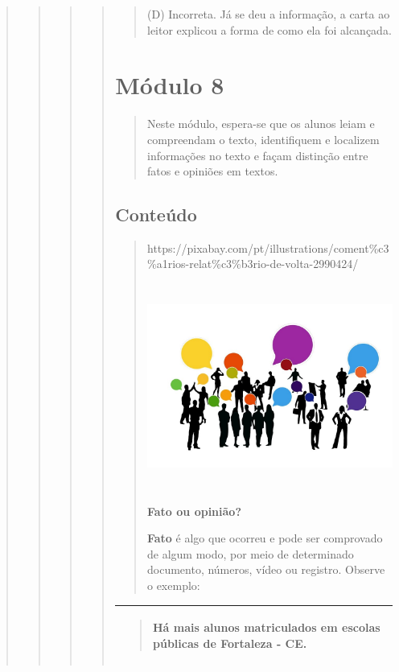\begin{quote}
\begin{quote}
\begin{quote}
\begin{quote}
\begin{quote}
(D) Incorreta. Já se deu a informação, a carta ao leitor explicou a
forma de como ela foi alcançada.
\end{quote}

\section{Módulo 8}\label{muxf3dulo-8}

\begin{quote}
Neste módulo, espera-se que os alunos leiam e compreendam o texto,
identifiquem e localizem informações no texto e façam distinção entre
fatos e opiniões em textos.
\end{quote}

\subsection{Conteúdo}\label{conteuxfado-7}

\begin{quote}
https://pixabay.com/pt/illustrations/coment\%c3\%a1rios-relat\%c3\%b3rio-de-volta-2990424/

\includegraphics[width=3.98294in,height=2.65514in]{media/image24.jpeg}

\textbf{Fato ou opinião?}

\textbf{Fato} é algo que ocorreu e pode ser comprovado de algum modo,
por meio de determinado documento, números, vídeo ou registro. Observe o
exemplo:
\end{quote}

\begin{longtable}[]{@{}l@{}}
\toprule
\begin{minipage}[t]{0.97\columnwidth}\raggedright\strut
\begin{quote}
Há mais alunos matriculados em escolas públicas de Fortaleza - CE.
\end{quote}\strut
\end{minipage}\tabularnewline
\bottomrule
\end{longtable}


\end{quote}
\end{quote}
\end{quote}
\end{quote}

